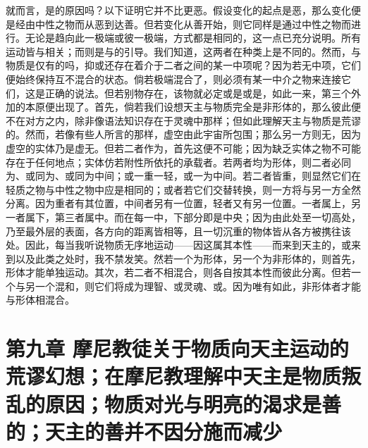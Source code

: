 就而言，是的原因吗？以下证明它并不比更恶。假设变化的起点是恶，那么变化便是经由中性之物而从恶到达善。但若变化从善开始，则它同样是通过中性之物而进行。无论是趋向此一极端或彼一极端，方式都是相同的，这一点已充分说明。所有运动皆与相关；而则是与的引导。我们知道，这两者在种类上是不同的。然而，与物质是仅有的吗，抑或还存在着介于二者之间的某一中项呢？因为若无中项，它们便始终保持互不混合的状态。倘若极端混合了，则必须有某一中介之物来连接它们，这是正确的说法。但若别物存在，该物就必定或是或是，如此一来，第三个外加的本原便出现了。首先，倘若我们设想天主与物质完全是非形体的，那么彼此便不在对方之内，除非像语法知识存在于灵魂中那样；但如此理解天主与物质是荒谬的。然而，若像有些人所言的那样，虚空由此宇宙所包围；那么另一方则无，因为虚空的实体乃是虚无。但若二者作为，首先这便不可能；因为缺乏实体之物不可能存在于任何地点；实体仿若附性所依托的承载者。若两者均为形体，则二者必同为、或同为、或同为中间；或一重一轻，或一为中间。若二者皆重，则显然它们在轻质之物与中性之物中应是相同的；或者若它们交替转换，则一方将与另一方全然分离。因为重者有其位置，中间者另有一位置，轻者又有另一位置。一者属上，另一者属下，第三者属中。而在每一中，下部分即是中央；因为由此处至一切高处，乃至最外层的表面，各方向的距离皆相等，且一切沉重的物体皆从各方被携往该处。因此，每当我听说物质无序地运动——因这属其本性——而来到天主的，或来到以及此类之处时，我不禁发笑。然若一个为形体，另一个为非形体的，则首先，形体才能单独运动。其次，若二者不相混合，则各自按其本性而彼此分离。但若一个与另一个混和，则它们将成为理智、或灵魂、或。因为唯有如此，非形体者才能与形体相混合。\par


\section{第九章 摩尼教徒关于物质向天主运动的荒谬幻想；在摩尼教理解中天主是物质叛乱的原因；物质对光与明亮的渴求是善的；天主的善并不因分施而减少}


